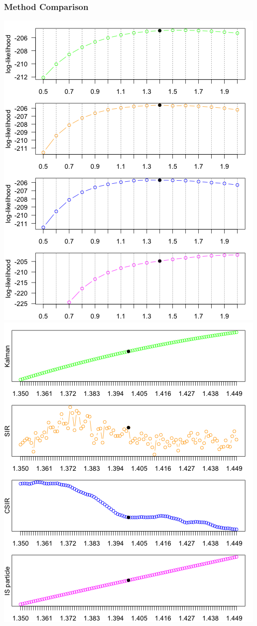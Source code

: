 \documentclass[11pt]{beamer}
\begin{document}
\begin{frame}
\frametitle{Method Comparison}
\centering
\includegraphics[scale=0.30]{ullm-loglik-eta}
\includegraphics[scale=0.30]{ullm-loglik-zoom}
\end{frame}
\end{document}
